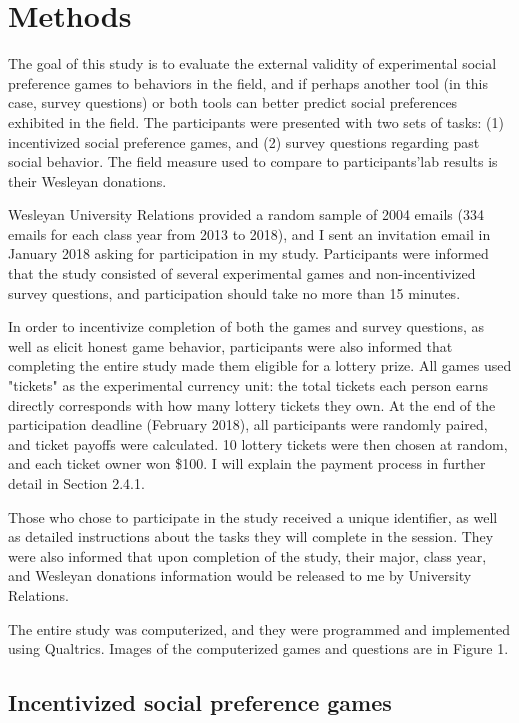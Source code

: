 \documentclass{article}
\begin{document}
\section{Methods}

The goal of this study is to evaluate the external validity of experimental social preference games to behaviors in the field, and if perhaps another tool (in this case, survey questions) or both tools can better predict social preferences exhibited in the field. The participants were presented with two sets of tasks: (1) incentivized social preference games, and (2) survey questions regarding past social behavior. The field measure used to compare to participants\rq lab results is their Wesleyan donations. 
 
Wesleyan University Relations provided a random sample of 2004 emails (334 emails for each class year from 2013 to 2018), and I sent an invitation email in January 2018 asking for participation in my study. Participants were informed that the study consisted of several experimental games and non-incentivized survey questions, and participation should take no more than 15 minutes. 

In order to incentivize completion of both the games and survey questions, as well as elicit honest game behavior, participants were also informed that completing the entire study made them eligible for a lottery prize. All games used "tickets" as the experimental currency unit: the total tickets each person earns directly corresponds with how many lottery tickets they own. At the end of the participation deadline (February 2018), all participants were randomly paired, and ticket payoffs were calculated. 10 lottery tickets were then chosen at random, and each ticket owner won \$100. I will explain the payment process in further detail in Section 2.4.1. 

Those who chose to participate in the study received a unique identifier, as well as detailed instructions about the tasks they will complete in the session. They were also informed that upon completion of the study, their major, class year, and Wesleyan donations information would be released to me by University Relations.

The entire study was computerized, and they were programmed and implemented using Qualtrics. Images of the computerized games and questions are in Figure 1.


\subsection{Incentivized social preference games}
\end{document}
